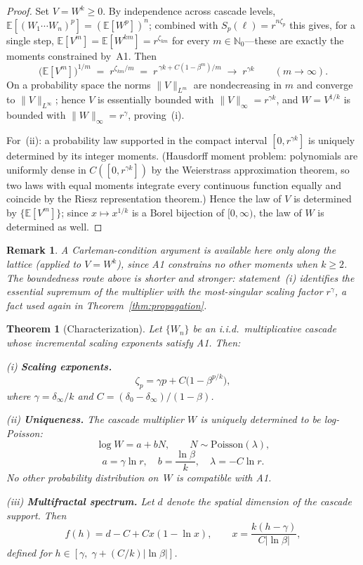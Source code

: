 \documentclass[pdflatex,sn-mathphys-num]{sn-jnl}
\theoremstyle{thmstyleone}
\newtheorem{theorem}{Theorem}
\theoremstyle{thmstyletwo}
\newtheorem*{remark}{Remark}
\theoremstyle{thmstylethree}
\begin{document}
\begin{proof}
Set $V = W^k \ge 0$.  By independence across cascade levels,
$\mathbb{E}[(W_1\cdots W_n)^p] = (\mathbb{E}[W^p])^n$; combined with
$S_p(\ell) = r^{n\zeta_p}$ this gives, for a single step,
$\mathbb{E}[V^m] = \mathbb{E}[W^{km}] = r^{\zeta_{km}}$ for every
$m \in \mathbb{N}_0$---these are exactly the moments constrained
by~A1.  Then
\[
  \bigl(\mathbb{E}[V^m]\bigr)^{1/m}
  \;=\; r^{\zeta_{km}/m}
  \;=\; r^{\,\gamma k + C(1-\beta^m)/m}
  \;\longrightarrow\; r^{\gamma k}
  \qquad (m \to \infty).
\]
On a probability space the norms $\|V\|_{L^m}$ are nondecreasing in
$m$ and converge to $\|V\|_{L^\infty}$; hence $V$ is essentially
bounded with $\|V\|_\infty = r^{\gamma k}$, and $W = V^{1/k}$ is
bounded with $\|W\|_\infty = r^{\gamma}$, proving~(i).

For~(ii): a probability law supported in the compact interval
$[0, r^{\gamma k}]$ is uniquely determined by its integer moments.
(Hausdorff moment problem: polynomials are uniformly dense in
$C([0,r^{\gamma k}])$ by the Weierstrass approximation theorem, so
two laws with equal moments integrate every continuous function
equally and coincide by the Riesz representation theorem.)  Hence
the law of $V$ is determined by $\{\mathbb{E}[V^m]\}$; since
$x \mapsto x^{1/k}$ is a Borel bijection of $[0,\infty)$, the law of
$W$ is determined as well.
\end{proof}

\begin{remark}
A Carleman-condition argument \cite{Akh65} is available here only
along the lattice (applied to $V = W^k$), since A1 constrains no
other moments when $k \ge 2$.  The boundedness route above is
shorter and stronger: statement~(i) identifies the essential
supremum of the multiplier with the most-singular scaling factor
$r^\gamma$, a fact used again in Theorem~\ref{thm:propagation}.
\end{remark}


\begin{theorem}[Characterization]\label{thm:characterization}
Let $\{W_n\}$ be an i.i.d.\ multiplicative cascade whose incremental
scaling exponents satisfy A1.  Then:

\textup{(i)} \textbf{Scaling exponents.}
\[
  \zeta_p = \gamma p + C\bigl(1 - \beta^{p/k}\bigr),
\]
where $\gamma = \delta_\infty/k$ and $C = (\delta_0 -
\delta_\infty)/(1-\beta)$.

\textup{(ii)} \textbf{Uniqueness.}  The cascade multiplier $W$ is
uniquely determined to be log-Poisson:
\[
  \log W = a + bN, \qquad N \sim \mathrm{Poisson}(\lambda),
\]
\[
  a = \gamma \ln r, \quad
  b = \frac{\ln\beta}{k}, \quad
  \lambda = -C\ln r.
\]
No other probability distribution on~$W$ is compatible with A1.

\textup{(iii)} \textbf{Multifractal spectrum.}  Let $d$ denote the
spatial dimension of the cascade support.  Then
\[
  f(h) = d - C + Cx(1 - \ln x),
  \qquad
  x = \frac{k(h - \gamma)}{C|\ln\beta|},
\]
defined for $h \in [\gamma,\; \gamma + (C/k)|\ln\beta|]$.
\end{theorem}
\end{document}
